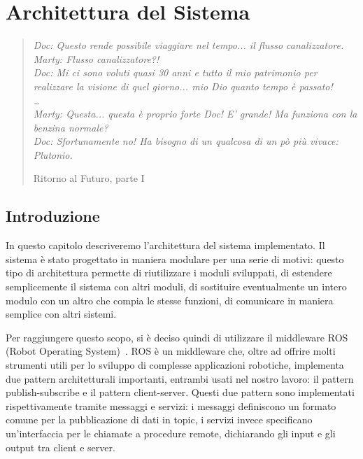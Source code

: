 \chapter{Architettura del Sistema}
\label{cap:architettura}
\thispagestyle{empty}

\begin{quotation}
{\footnotesize
\noindent \emph{Doc: Questo rende possibile viaggiare nel tempo... il flusso canalizzatore.
Marty: Flusso canalizzatore?! \\
Doc: Mi ci sono voluti quasi 30 anni e tutto il mio patrimonio per realizzare la visione di quel giorno... mio Dio quanto tempo è passato! \\
\dots \\
Marty: Questa... questa è proprio forte Doc! E' grande! Ma funziona con la benzina normale? \\
Doc: Sfortunamente no! Ha bisogno di un qualcosa di un pò più vivace: Plutonio.
}
\begin{flushright}
Ritorno al Futuro, parte I
\end{flushright}
}
\end{quotation}
\vspace{0.5cm}

\section{Introduzione}

In questo capitolo descriveremo l'architettura del sistema implementato. Il sistema è stato progettato in maniera modulare per una serie di motivi: questo tipo di architettura permette di riutilizzare i moduli sviluppati, di estendere semplicemente il sistema con altri moduli, di sostituire eventualmente un intero modulo con un altro che compia le stesse funzioni, di comunicare in maniera semplice con altri sistemi. 

Per raggiungere questo scopo, si è deciso quindi di utilizzare il middleware ROS (Robot Operating System)~\cite{quigley2009ros}.
ROS è un middleware che, oltre ad offrire molti strumenti utili per lo sviluppo di complesse applicazioni robotiche, implementa due pattern architetturali importanti, entrambi usati nel nostro lavoro: il pattern publish-subscribe e il pattern client-server.
Questi due pattern sono implementati rispettivamente tramite messaggi e servizi: i messaggi definiscono un formato comune per la pubblicazione di dati in topic, i servizi invece specificano un'interfaccia per le chiamate a procedure remote, dichiarando gli input e gli output tra client e server.

